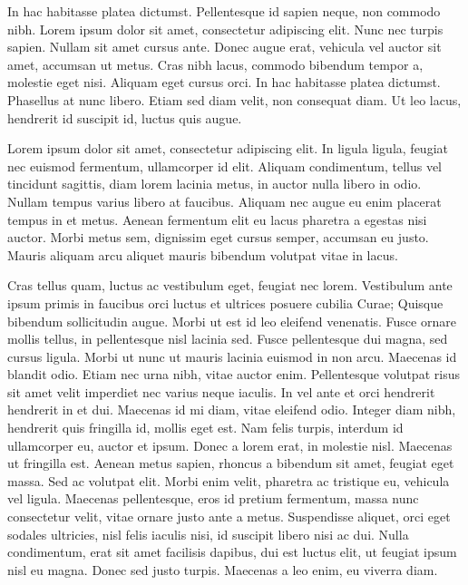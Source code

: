 \documentclass[letterpaper,12pt,twocolumn,landscape]{memoir}
\begin{document}
In hac habitasse platea dictumst. Pellentesque id sapien neque, non commodo nibh. Lorem ipsum dolor sit amet, consectetur adipiscing elit. Nunc nec turpis sapien. Nullam sit amet cursus ante. Donec augue erat, vehicula vel auctor sit amet, accumsan ut metus. Cras nibh lacus, commodo bibendum tempor a, molestie eget nisi. Aliquam eget cursus orci. In hac habitasse platea dictumst. Phasellus at nunc libero. Etiam sed diam velit, non consequat diam. Ut leo lacus, hendrerit id suscipit id, luctus quis augue.

Lorem ipsum dolor sit amet, consectetur adipiscing elit. In ligula ligula, feugiat nec euismod fermentum, ullamcorper id elit. Aliquam condimentum, tellus vel tincidunt sagittis, diam lorem lacinia metus, in auctor nulla libero in odio. Nullam tempus varius libero at faucibus. Aliquam nec augue eu enim placerat tempus in et metus. Aenean fermentum elit eu lacus pharetra a egestas nisi auctor. Morbi metus sem, dignissim eget cursus semper, accumsan eu justo. Mauris aliquam arcu aliquet mauris bibendum volutpat vitae in lacus.

Cras tellus quam, luctus ac vestibulum eget, feugiat nec lorem. Vestibulum ante ipsum primis in faucibus orci luctus et ultrices posuere cubilia Curae; Quisque bibendum sollicitudin augue. Morbi ut est id leo eleifend venenatis. Fusce ornare mollis tellus, in pellentesque nisl lacinia sed. Fusce pellentesque dui magna, sed cursus ligula. Morbi ut nunc ut mauris lacinia euismod in non arcu. Maecenas id blandit odio. Etiam nec urna nibh, vitae auctor enim. Pellentesque volutpat risus sit amet velit imperdiet nec varius neque iaculis. In vel ante et orci hendrerit hendrerit in et dui. Maecenas id mi diam, vitae eleifend odio. Integer diam nibh, hendrerit quis fringilla id, mollis eget est. Nam felis turpis, interdum id ullamcorper eu, auctor et ipsum. Donec a lorem erat, in molestie nisl. Maecenas ut fringilla est.
Aenean metus sapien, rhoncus a bibendum sit amet, feugiat eget massa. Sed ac volutpat elit. Morbi enim velit, pharetra ac tristique eu, vehicula vel ligula. Maecenas pellentesque, eros id pretium fermentum, massa nunc consectetur velit, vitae ornare justo ante a metus. Suspendisse aliquet, orci eget sodales ultricies, nisl felis iaculis nisi, id suscipit libero nisi ac dui. Nulla condimentum, erat sit amet facilisis dapibus, dui est luctus elit, ut feugiat ipsum nisl eu magna. Donec sed justo turpis. Maecenas a leo enim, eu viverra diam.
\end{document}
